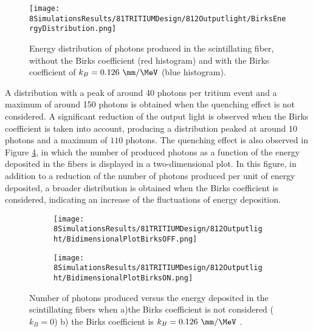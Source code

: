 \begin{figure}[h]
\centering
\texttt{[image: 8SimulationsResults/81TRITIUMDesign/812Outputlight/BirksEnergyDistribution.png]}
\caption{Energy distribution of photons produced in the scintillating fiber, without the Birks coefficient (red histogram) and with the Birks coefficient of $k_B=0.126~\mm/\MeV$ (blue histogram)\cite{SimulationPaperCarlos}.\label{fig:BirksEffectinEnergyDistribution}}
\end{figure}  

A distribution with a peak of around 40 photons per tritium event and a maximum of around 150 photons is obtained when the quenching effect is not considered. A significant reduction of the output light is observed when the Birks coefficient is taken into account, producing a distribution peaked at around $10$ photons and a maximum of $110$ photons. The quenching effect is also observed in Figure \ref{fig:2DimPlotBirks}, in which the number of produced photons as a function of the energy deposited in the fibers is displayed in a two-dimensional plot. In this figure, in addition to a reduction of the number of photons produced per unit of energy deposited, a broader distribution is obtained when the Birks coefficient is considered, indicating an increase of the fluctuations of energy deposition.

\begin{figure}
\centering
    \begin{subfigure}[b]{0.4\textwidth}
    \centering
    \texttt{[image: 8SimulationsResults/81TRITIUMDesign/812Outputlight/BidimensionalPlotBirksOFF.png]}  
    \caption{\label{subfig:2DimPlotNoBirks}}
    \end{subfigure}
    \hfill
    \begin{subfigure}[b]{0.4\textwidth}
    \centering
    \texttt{[image: 8SimulationsResults/81TRITIUMDesign/812Outputlight/BidimensionalPlotBirksON.png]}  
    \caption{\label{subfig:2DimPlotBirks}}
    \end{subfigure}
 \caption{Number of photons produced versus the energy deposited in the scintillating fibers when a)the Birks coefficient is not considered ($k_B=0$) b) the Birks coefficient is $k_B=0.126~\mm/\MeV$ \cite{SimulationPaperCarlos}.}
 \label{fig:2DimPlotBirks}
\end{figure}